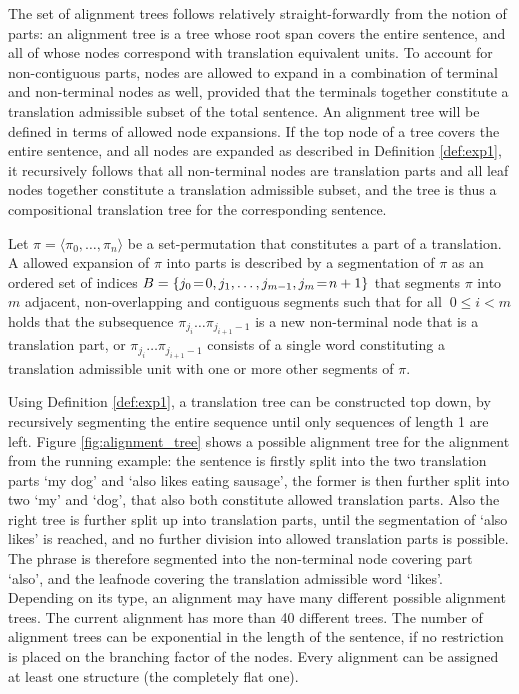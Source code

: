 \documentclass{report}
\begin{document}
The set of alignment trees follows relatively straight-forwardly from the notion of parts: an alignment tree is a tree whose root span covers the entire sentence, and all of whose nodes correspond with translation equivalent units. To account for non-contiguous parts, nodes are allowed to expand in a combination of terminal and non-terminal nodes as well, provided that the terminals together constitute a translation admissible subset of the total sentence. An alignment tree will be defined in terms of allowed node expansions. If the top node of a tree covers the entire sentence, and all nodes are expanded as described in Definition \ref{def:exp1}, it recursively follows that all non-terminal nodes are translation parts and all leaf nodes together constitute a translation admissible subset, and the tree is thus a compositional translation tree for the corresponding sentence.

\begin{definition}\label{def:exp1}
Let $\pi = \langle \pi_0, \ldots,\pi_n\rangle$ be a set-permutation that constitutes a part of a translation. A allowed expansion of $\pi$ into parts is described by a segmentation of $\pi$ as an ordered set of indices $B = \{j_0\negthinspace=\negthinspace 0, j_1, \ldots ,j_{m-1},j_m\negthinspace=\negthinspace n+1\}$ that segments $\pi$ into $m$ adjacent, non-overlapping and contiguous segments such that for all $~0\leq i < m$ holds that the subsequence $\pi_{j_i}\ldots\pi_{j_{i+1}-1}$ is a new non-terminal node that is a translation part, or $\pi_{j_i}\ldots\pi_{j_{i+1}-1}$ consists of a single word constituting a translation admissible unit with one or more other segments of $\pi$.
\end{definition}

Using Definition \ref{def:exp1}, a translation tree can be constructed top down, by recursively segmenting the entire sequence until only sequences of length 1 are left. Figure \ref{fig:alignment_tree} shows a possible alignment tree for the alignment from the running example: the sentence is firstly split into the two translation parts `my dog' and `also likes eating sausage', the former is then further split into two `my' and `dog', that also both constitute allowed translation parts. Also the right tree is further split up into translation parts, until the segmentation of `also likes' is reached, and no further division into allowed translation parts is possible. The phrase is therefore segmented into the non-terminal node covering part `also', and the leafnode covering the translation admissible word `likes'. Depending on its type, an alignment may have many different possible alignment trees. The current alignment has more than 40 different trees. The number of alignment trees can be exponential in the length of the sentence, if no restriction is placed on the branching factor of the nodes. Every alignment can be assigned at least one structure (the completely flat one).
\end{document}
